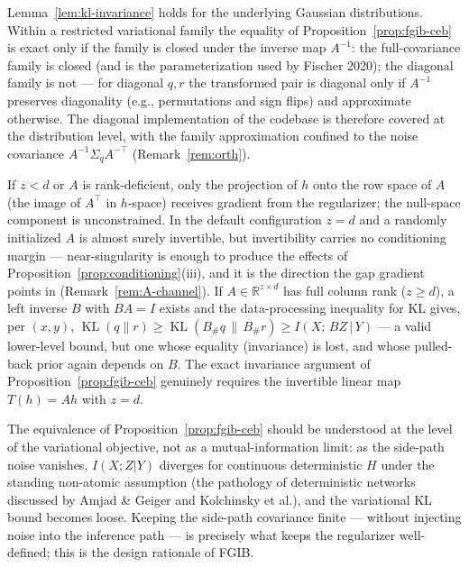 \begin{remark}\label{rem:closure}
Lemma~\ref{lem:kl-invariance} holds for the underlying Gaussian distributions. Within a
restricted variational family the equality of Proposition~\ref{prop:fgib-ceb} is exact
only if the family is closed under the inverse map $A^{-1}$: the full-covariance family
is closed (and is the parameterization used by Fischer 2020); the diagonal family is not
--- for diagonal $q, r$ the transformed pair is diagonal only if $A^{-1}$ preserves
diagonality (e.g., permutations and sign flips) and approximate otherwise. The diagonal
implementation of the codebase is therefore covered at the distribution level, with the
family approximation confined to the noise covariance $A^{-1}\Sigma_q A^{-\top}$
(Remark~\ref{rem:orth}).
\end{remark}

\begin{remark}\label{rem:rank}
If $z < d$ or $A$ is rank-deficient, only the projection of $h$ onto the row space of
$A$ (the image of $A^{\top}$ in $h$-space) receives gradient from the regularizer; the
null-space component is unconstrained.
In the default configuration $z = d$ and a randomly initialized $A$ is almost surely
invertible, but invertibility carries no conditioning margin --- near-singularity is
enough to produce the effects of Proposition~\ref{prop:conditioning}(iii), and it is the
direction the gap gradient points in (Remark~\ref{rem:A-channel}). If $A \in
\mathbb{R}^{z \times d}$ has full column rank ($z \ge d$), a left inverse $B$ with
$BA = I$ exists and the data-processing inequality for KL gives, per $(x,y)$,
$\operatorname{KL}(q\|r) \ge \operatorname{KL}(B_\# q\,\|\,B_\# r)
\ge I(X;\,BZ\,|\,Y)$ --- a valid lower-level bound, but one whose equality
(invariance) is lost, and whose pulled-back prior again depends on $B$. The exact
invariance argument of Proposition~\ref{prop:fgib-ceb} genuinely requires the invertible
linear map $T(h) = Ah$ with $z = d$.
\end{remark}

\begin{remark}\label{rem:limit}
The equivalence of Proposition~\ref{prop:fgib-ceb} should be understood at the level of
the variational objective, not as a mutual-information limit: as the side-path noise
vanishes, $I(X;Z|Y)$ diverges for continuous deterministic $H$ under the standing
non-atomic assumption (the pathology of
deterministic networks discussed by Amjad \& Geiger and Kolchinsky et al.), and the
variational KL bound becomes loose. Keeping the side-path covariance finite --- without
injecting noise into the inference path --- is precisely what keeps the regularizer
well-defined; this is the design rationale of FGIB.
\end{remark}

